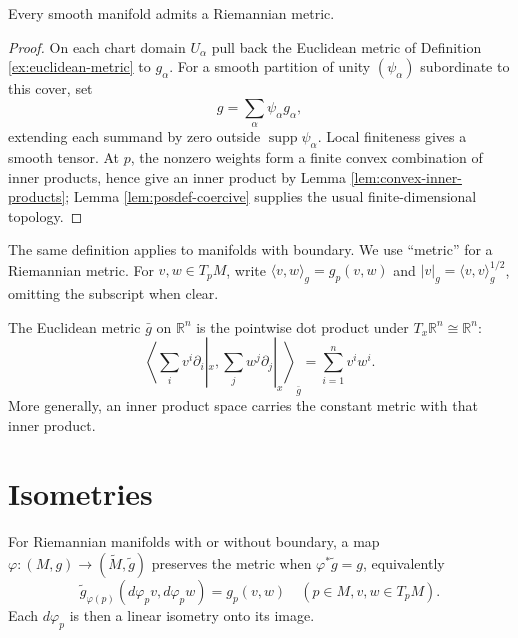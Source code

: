 \begin{proposition}
\label{prop:existence-riemannian-metric}
\leanok
{}
Every smooth manifold admits a Riemannian metric.
\end{proposition}
\begin{proof}
\leanok
{}
\sketch On each chart domain $U_\alpha$ pull back the Euclidean metric of Definition \ref{ex:euclidean-metric} to $g_\alpha$. For a smooth partition of unity $(\psi_\alpha)$ subordinate to this cover, set
\[
g=\sum_\alpha\psi_\alpha g_\alpha,
\]
extending each summand by zero outside $\operatorname{supp}\psi_\alpha$. Local finiteness gives a smooth tensor. At $p$, the nonzero weights form a finite convex combination of inner products, hence give an inner product by Lemma \ref{lem:convex-inner-products}; Lemma \ref{lem:posdef-coercive} supplies the usual finite-dimensional topology.
\end{proof}

The same definition applies to manifolds with boundary. We use ``metric'' for a Riemannian metric. For $v,w\in T_pM$, write $\langle v,w\rangle_g=g_p(v,w)$ and $|v|_g=\langle v,v\rangle_g^{1/2}$, omitting the subscript when clear.

\begin{definition}
\label{ex:euclidean-metric}
\leanok
{}
The Euclidean metric $\bar g$ on $\mathbb R^n$ is the pointwise dot product under $T_x\mathbb R^n\cong\mathbb R^n$:
\[
\left\langle\sum_i v^i\partial_i|_x,\sum_j w^j\partial_j|_x\right\rangle_{\bar g}=\sum_{i=1}^n v^i w^i.
\]
More generally, an inner product space carries the constant metric with that inner product.
\end{definition}

\section{Isometries}

\begin{definition}
\label{def:metric-preserving}
\leanok
{}
For Riemannian manifolds with or without boundary, a map $\varphi:(M,g)\to(\widetilde M,\widetilde g)$ preserves the metric when $\varphi^*\widetilde g=g$, equivalently
\[
\widetilde g_{\varphi(p)}(d\varphi_pv,d\varphi_pw)=g_p(v,w)
\quad(p\in M, v,w\in T_pM).
\]
Each $d\varphi_p$ is then a linear isometry onto its image.
\end{definition}

